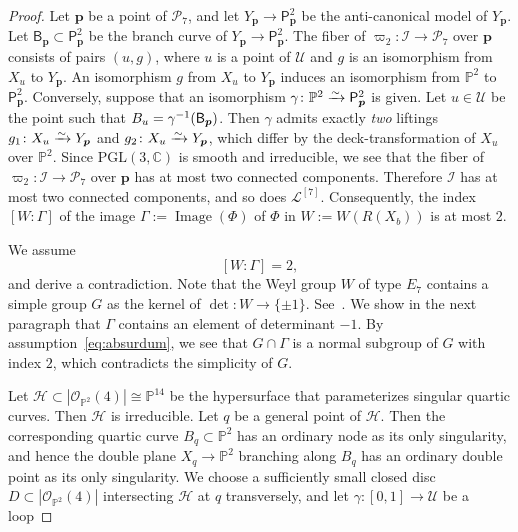 \documentclass{math}
\theoremstyle{plain}
\numberwithin{equation}{section}
\newcommand{\CC}{\mathord{\mathbb C}}
\newcommand{\PP}{\mathord{\mathbb  P}}
\newcommand{\HHH}{\mathord{\mathcal H}}
\newcommand{\III}{\mathord{\mathcal I}}
\newcommand{\LLL}{\mathord{\mathcal L}}
\newcommand{\OOO}{\mathord{\mathcal O}}
\newcommand{\PPP}{\mathord{\mathcal P}}
\newcommand{\UUU}{\mathord{\mathcal U}}
\newcommand{\isom}{\xrightarrow{\raise -3pt \hbox{\scriptsize $\sim$} }}
\newcommand{\inv}{\sp{-1}}
\DeclareMathOperator{\Image}{Image}
\newcommand{\PGL}{\mathord{\mathrm{PGL}}}
\newcommand{\mon}{\Phi}
\newcommand{\LLn}[1]{\LLL^{[#1]}}
\newcommand{\bp}{\bm{p}}
\newcommand{\sfP}{\mathsf{P}}
\newcommand{\sfB}{\mathsf{B}}
\begin{document}
\begin{proof}
Let $\bp$ be a point of $\PPP_7$,
and let $Y_{\bp} \to {\sfP}_{\bp}^2$ 
be the anti-canonical model of $Y_{\bp}$.
Let $\sfB_{\bp}\subset {\sfP}_{\bp}^2$ be the branch curve of $Y_{\bp} \to {\sfP}_{\bp}^2$.
The fiber of $\varpi_2\colon \III\to \PPP_7$ 
over $\bp$ consists 
of pairs $(u, g)$,
where $u$ is a point of $\UUU$
and $g$ is an isomorphism from $X_u$ to $Y_{\bp}$.
An isomorphism $g$ from $X_u$ to $Y_{\bp}$
induces an isomorphism from $\PP^2$ to ${\sfP}_{\bp}^2$.
%
Conversely,
suppose that an isomorphism $\gamma\colon \PP^2\isom {\sfP}_{\bp}^2$ is given.
Let $u\in \UUU$ be the point such that $B_{u}=\gamma\inv(\sfB_{\bp})$.
Then $\gamma$ admits exactly \emph{two}  liftings
$g_1\colon   X_u \isom Y_{\bp}$
and $g_2\colon  X_u \isom Y_{\bp}$,
which differ by the deck-transformation of $X_u$ over  $\PP^2$.
Since $\PGL(3, \CC)$ is smooth and irreducible,
we see that the fiber of $\varpi_2\colon \III\to \PPP_7$ 
over $\bp$ has at most two connected components.
Therefore
$\III$  has at most two connected components,
and so does $\LLn{7}$.
Consequently,
the index $[W: \Gamma]$ of the image
$\Gamma:=\Image(\mon)$
of $\mon$ in $W:=W(R(X_b))$  is at most $2$.
\par
We assume 
%
\begin{equation}\label{eq:absurdum}
[W: \Gamma]=2, 
\end{equation}
%
and derive a contradiction.
Note  that the Weyl group $W$ of type $E_7$ contains a simple group $G$  
as the kernel of $\det \colon W \to \{\pm 1\}$.
See~\cite[page 46]{ATLAS1985}.
We show in the next paragraph  that  $\Gamma$  contains an element of determinant $-1$.
By assumption~\eqref{eq:absurdum}, we see that 
$G\cap \Gamma$ is a normal subgroup of $G$ with index $2$,
which contradicts the simplicity of $G$.
\par
Let $\HHH\subset |\OOO_{\PP^2}(4)|\cong \PP^{14}$ 
be the hypersurface that parameterizes singular quartic curves.
Then $\HHH$ is irreducible. 
Let $q$ be a general point of $\HHH$.
Then the corresponding quartic curve $B_q\subset \PP^2$ 
has an  ordinary node as its only singularity, 
and hence the double plane $X_q\to \PP^2$ branching along $B_q$ has 
an ordinary double point as its only singularity.
We choose a sufficiently small closed disc $D\subset |\OOO_{\PP^2}(4)|$ 
intersecting $\HHH$ at $q$ transversely,
and let
$\gamma\colon[0,1]\to \UUU$ be a loop 

\end{proof}
\end{document}
